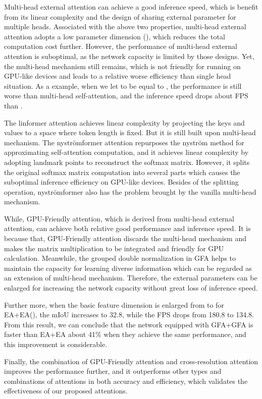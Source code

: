 \documentclass{article}
\begin{document}
Multi-head external attention can achieve a good inference speed, which is benefit from its linear complexity and the design of sharing external parameter for multiple heads. Associated with the above two properties, multi-head external attention adopts a low parameter dimension (), which reduces the total computation cost further. However, the performance of multi-head external attention is suboptimal, as the network capacity is limited by those designs. Yet, the multi-head mechanism still remains, which is not friendly for running on GPU-like devices and leads to a relative worse efficiency than single head situation. As a example, when we let  to be equal to , the performance is still worse than multi-head self-attention, and the inference speed drops about FPS than .

The linformer attention achieves linear complexity by projecting the keys and values to a space where token length is fixed. But it is still built upon multi-head mechanism. The nystr{\"o}mformer attention repurposes the nystr{\"o}m method for approximating self-attention computation, and it achieves linear complexity by adopting landmark points to reconstruct the softmax matrix. However, it splits the original softmax matrix computation into several parts which causes the suboptimal inference efficiency on GPU-like devices. Besides of the splitting operation, nystr{\"o}mformer also has the problem brought by the vanilla multi-head mechanism.

While, GPU-Friendly attention, which is derived from multi-head external attention, can achieve both relative good performance and inference speed. It is because that, GPU-Friendly attention discards the multi-head mechanism and makes the matrix multiplication to be integrated and friendly for GPU calculation. Meanwhile, the grouped double normalization in GFA helps to maintain the capacity for learning diverse information which can be regarded as an extension of multi-head mechanism. Therefore, the external parameters can be enlarged for increasing the network capacity without great loss of inference speed.

Further more, when the basic feature dimension  is enlarged from  to  for EA+EA(), the mIoU increases to 32.8, while the FPS drops from 180.8 to 134.8. From this result, we can conclude that the network equipped with GFA+GFA is faster than EA+EA about 41\% when they achieve the same performance, and this improvement is considerable.

Finally, the combination of GPU-Friendly attention and cross-resolution attention improves the performance further, and it outperforms other types and combinations of attentions in both accuracy and efficiency, which validates the effectiveness of our proposed attentions.
\end{document}
